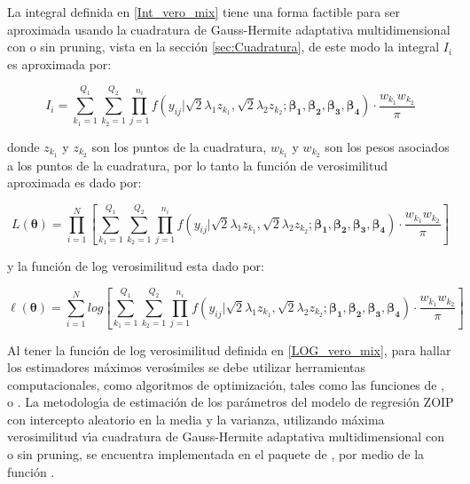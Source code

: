 La integral definida en \eqref{Int_vero_mix} tiene una forma factible para ser aproximada usando la cuadratura de Gauss-Hermite adaptativa multidimensional con o sin pruning, vista en la secci\'{o}n \ref{sec:Cuadratura}, de este modo la integral $I_i$ es aproximada por:

\[
I_i=\sum_{k_1=1}^{Q_1}{\sum_{k_2=1}^{Q_2}{\prod_{j=1}^{n_i}f(y_{ij}|\sqrt{2}\lambda_1 z_{k_1},\sqrt{2}\lambda_2 z_{k_2};\boldsymbol{\beta_1}, \boldsymbol{\beta_2}, \boldsymbol{\beta_3}, \boldsymbol{\beta_4})\cdot \frac{w_{k_1}w_{k_2}}{\pi}}}
\]

donde $z_{k_1}$ y $z_{k_2}$ son los puntos de la cuadratura, $w_{k_1}$ y $w_{k_2}$ son los pesos asociados a los puntos de la cuadratura, por lo tanto la funci\'{o}n de verosimilitud aproximada es dado por:

\[
L(\boldsymbol{\theta})=\prod_{i=1}^{N}{\left[\sum_{k_1=1}^{Q_1}{\sum_{k_2=1}^{Q_2}{\prod_{j=1}^{n_i}f(y_{ij}|\sqrt{2}\lambda_1 z_{k_1},\sqrt{2}\lambda_2 z_{k_2};\boldsymbol{\beta_1}, \boldsymbol{\beta_2}, \boldsymbol{\beta_3}, \boldsymbol{\beta_4})\cdot \frac{w_{k_1}w_{k_2}}{\pi}}}\right]}
\]

y la funci\'{o}n de log verosimilitud esta dado por:

\begin{equation}
\ell(\boldsymbol{\theta})=\sum_{i=1}^{N}log{\left[\sum_{k_1=1}^{Q_1}{\sum_{k_2=1}^{Q_2}{\prod_{j=1}^{n_i}f(y_{ij}|\sqrt{2}\lambda_1 z_{k_1},\sqrt{2}\lambda_2 z_{k_2};\boldsymbol{\beta_1}, \boldsymbol{\beta_2}, \boldsymbol{\beta_3}, \boldsymbol{\beta_4})\cdot \frac{w_{k_1}w_{k_2}}{\pi}}}\right]}
\label{LOG_vero_mix}
\end{equation}

Al tener la funci\'{o}n de log verosimilitud definida en \eqref{LOG_vero_mix}, para hallar los estimadores m\'{a}ximos veros\'{\i}miles se debe utilizar herramientas computacionales, como algoritmos de optimizaci\'{o}n, tales como las funciones de ,  o . La metodolog\'{\i}a de estimaci\'{o}n de los par\'{a}metros del modelo de regresi\'{o}n ZOIP con intercepto aleatorio en la media y la varianza, utilizando m\'{a}xima verosimilitud v\'{\i}a cuadratura de Gauss-Hermite adaptativa multidimensional con o sin pruning, se encuentra implementada en el paquete  de , por medio de la funci\'{o}n .